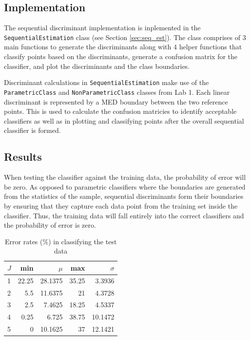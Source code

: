 \subsection{Implementation}
The sequential discriminant implementation is inplemented in the
\texttt{SequentialEstimation} class (see Section \ref{sec:seq_est}). The
class comprises of 3 main functions to generate the discriminants along with 4
helper functions that classify points based on the discriminants, generate a
confusion matrix for the classifier, and plot the discriminants and the class
boundaries.

Discriminant calculations in \texttt{SequentialEstimation} make use of the
\texttt{ParametricClass} and \texttt{NonParametricClass} classes from Lab 1.
Each linear discriminant is represented by a MED boundary between the two
reference points. This is used to calculate the confusion matricies to identify
acceptable classifiers as well as in plotting and classifying points after the
overall sequential classifier is formed.

\subsection{Results}

When testing the classifier against the training data, the probability of error
will be zero. As opposed to parametric classifiers where the boundaries are generated from
the statistics of the sample, sequential discriminants form their boundaries by
ensuring that they capture each data point from the training set inside the
classifier. Thus, the training data will fall entirely into the correct
classifiers and the probability of error is zero.

\begin{table}
\centering
\caption{Error rates (\%) in classifying the test data}
\label{tab:error_rates}
\begin{tabular}{lrrrr}
\toprule
$J$ & min & $\mu$ & max & $\sigma$\\
\midrule
1 & 22.25 & 28.1375 & 35.25 & 3.3936\\
2 & 5.5 & 11.6375 & 21 & 4.3728\\
3 & 2.5 & 7.4625 & 18.25 & 4.5337\\
4 & 0.25 & 6.725 & 38.75 & 10.1472\\
5 & 0 & 10.1625 & 37 & 12.1421\\
\bottomrule
\end{tabular}
\end{table}


